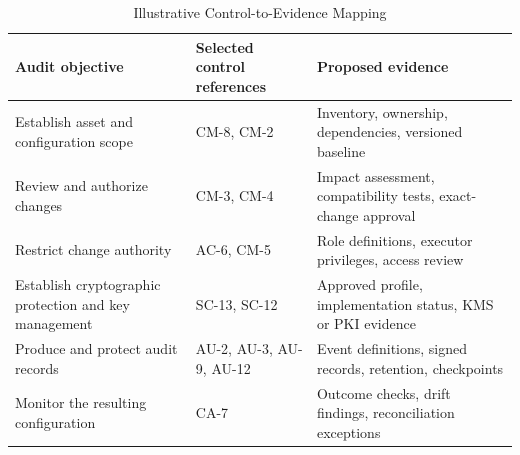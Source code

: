 \begin{table}[!t]
\caption{Illustrative Control-to-Evidence Mapping}
\label{tab:controls}
\centering
\begin{tabular}{>{\raggedright\arraybackslash}p{4.4cm}>{\raggedright\arraybackslash}p{3.6cm}>{\raggedright\arraybackslash}p{7.4cm}}
\toprule
Audit objective & Selected control references & Proposed evidence \\
\midrule
Establish asset and configuration scope & CM-8, CM-2 & Inventory, ownership, dependencies, versioned baseline \\
Review and authorize changes & CM-3, CM-4 & Impact assessment, compatibility tests, exact-change approval \\
Restrict change authority & AC-6, CM-5 & Role definitions, executor privileges, access review \\
Establish cryptographic protection and key management & SC-13, SC-12 & Approved profile, implementation status, KMS or PKI evidence \\
Produce and protect audit records & AU-2, AU-3, AU-9, AU-12 & Event definitions, signed records, retention, checkpoints \\
Monitor the resulting configuration & CA-7 & Outcome checks, drift findings, reconciliation exceptions \\
\bottomrule
\end{tabular}
\end{table}
